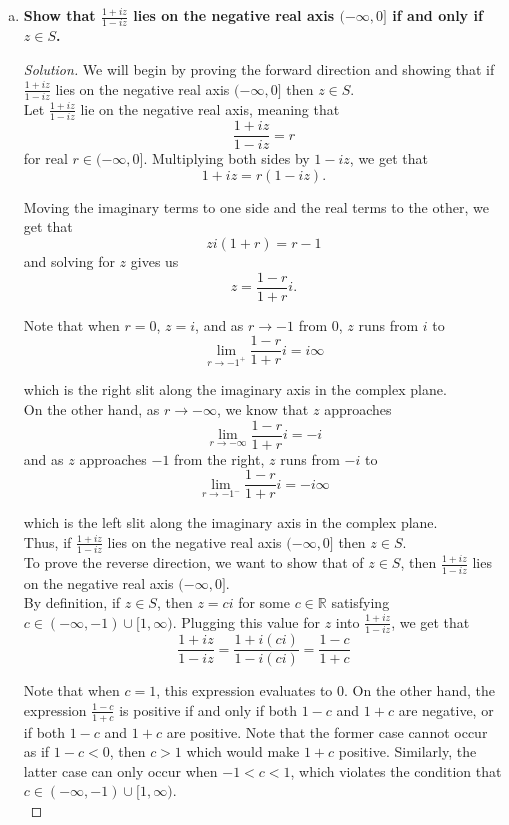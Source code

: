 \documentclass[11pt]{article}
\newenvironment{solution}
  {\renewcommand\qedsymbol{$\blacksquare$}\begin{proof}[Solution]}
  {\end{proof}}
\theoremstyle{definition}
\begin{document}
\begin{enumerate}[a)]
\item \textbf{Show that $\frac{1+iz}{1-iz}$ lies on the negative real axis $(-\infty, 0]$ if and only if $z \in S$.}

\begin{solution}

We will begin by proving the forward direction and showing that if $\frac{1+iz}{1-iz}$ lies on the negative real axis $(-\infty, 0]$ then $z \in S$. \\

Let $\frac{1+iz}{1-iz}$ lie on the negative real axis, meaning that \[ \frac{1+iz}{1-iz} = r \] for real $r \in (-\infty, 0].$ Multiplying both sides by $1-iz$, we get that
\[ 1+iz = r(1-iz).\]

Moving the imaginary terms to one side and the real terms to the other, we get that \[zi(1+r) = r-1\] and solving for $z$ gives us
\[ z = \frac{1-r}{1+r}i. \]

Note that when $r=0$, $z=i$, and as $r \rightarrow -1$ from $0$, $z$ runs from $i$ to \[\lim\limits_{r \rightarrow -1^{+}} \frac{1-r}{1+r}i = i\infty\]

which is the right slit along the imaginary axis in the complex plane. \\

On the other hand, as $r \rightarrow -\infty$, we know that $z$ approaches \[ \lim\limits_{r \rightarrow -\infty} \frac{1-r}{1+r}i = -i\] and as $z$ approaches $-1$ from the right, $z$ runs from $-i$ to
\[ \lim\limits_{r \rightarrow -1^{-}} \frac{1-r}{1+r}i = -i\infty\]

which is the left slit along the imaginary axis in the complex plane. \\

Thus, if $\frac{1+iz}{1-iz}$ lies on the negative real axis $(-\infty, 0]$ then $z \in S$. \\


To prove the reverse direction, we want to show that of $z \in S$, then $\frac{1+iz}{1-iz}$ lies on the negative real axis $(-\infty, 0].$ \\

By definition, if $z \in S$, then $z=ci$ for some $c \in \mathbb{R}$ satisfying $c \in (-\infty, -1) \cup [1, \infty).$ Plugging this value for $z$ into $\frac{1+iz}{1-iz}$, we get that
\[ \frac{1+iz}{1-iz} = \frac{1+i(ci)}{1-i(ci)} = \frac{1-c}{1+c}\]


Note that when $c=1$, this expression evaluates to $0$. On the other hand, the expression $\frac{1-c}{1+c}$ is positive if and only if both $1-c$ and $1+c$ are negative,
or if both $1-c$ and $1+c$ are positive. Note that the former case cannot occur as if $1-c < 0$, then $c>1$ which would make $1+c$ positive. Similarly, the latter case can only occur when $-1 < c < 1$, which violates
the condition that $c \in (-\infty, -1) \cup [1, \infty).$ \\


\end{solution}
\end{enumerate}
\end{document}
